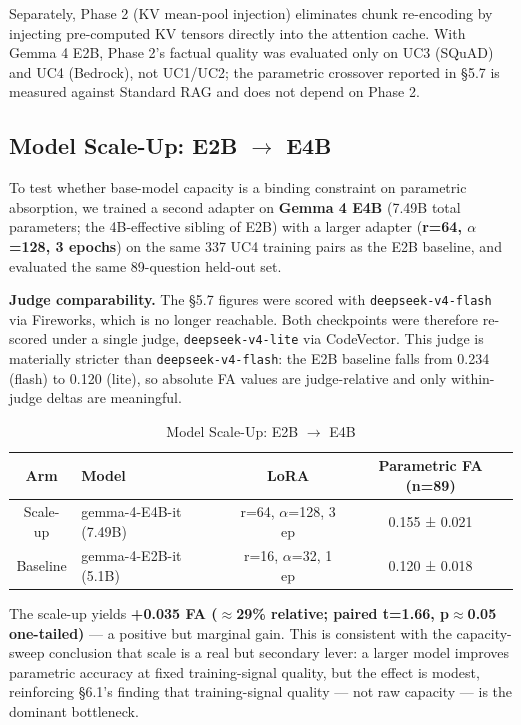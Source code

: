 \documentclass[10pt,twocolumn]{article}
\begin{document}
Separately, Phase 2 (KV mean-pool injection) eliminates chunk re-encoding by injecting pre-computed KV tensors directly into the attention cache. With Gemma 4 E2B, Phase 2's factual quality was evaluated only on UC3 (SQuAD) and UC4 (Bedrock), not UC1/UC2; the parametric crossover reported in \S{}5.7 is measured against Standard RAG and does not depend on Phase 2.


\subsection{Model Scale-Up: E2B $\to$ E4B}

To test whether base-model capacity is a binding constraint on parametric absorption, we trained a second adapter on \textbf{Gemma 4 E4B} (7.49B total parameters; the 4B-effective sibling of E2B) with a larger adapter (\textbf{r=64, $\alpha$=128, 3 epochs}) on the same 337 UC4 training pairs as the E2B baseline, and evaluated the same 89-question held-out set.


\textbf{Judge comparability.} The \S{}5.7 figures were scored with \texttt{deepseek-v4-flash} via Fireworks, which is no longer reachable. Both checkpoints were therefore re-scored under a single judge, \texttt{deepseek-v4-lite} via CodeVector. This judge is materially stricter than \texttt{deepseek-v4-flash}: the E2B baseline falls from 0.234 (flash) to 0.120 (lite), so absolute FA values are judge-relative and only within-judge deltas are meaningful.


\begin{table}[htbp]
  \centering\small
  \caption{Model Scale-Up: E2B $\to$ E4B}
  \label{tab:model-scale-up-e2b-e4b}
  \begin{tabularx}{\columnwidth}{cLcc}
  \toprule
    Arm & Model & LoRA & Parametric FA (n=89) \\
  \midrule
  \midrule
  Scale-up & gemma-4-E4B-it (7.49B) & r=64, $\alpha$=128, 3 ep & 0.155 ± 0.021 \\
  Baseline & gemma-4-E2B-it (5.1B) & r=16, $\alpha$=32, 1 ep & 0.120 ± 0.018 \\
  \bottomrule
  \end{tabularx}
\end{table}


The scale-up yields \textbf{+0.035 FA ($\approx$29\% relative; paired t=1.66, p$\approx$0.05 one-tailed)} --- a positive but marginal gain. This is consistent with the capacity-sweep conclusion that scale is a real but secondary lever: a larger model improves parametric accuracy at fixed training-signal quality, but the effect is modest, reinforcing \S{}6.1's finding that training-signal quality --- not raw capacity --- is the dominant bottleneck.
\end{document}
